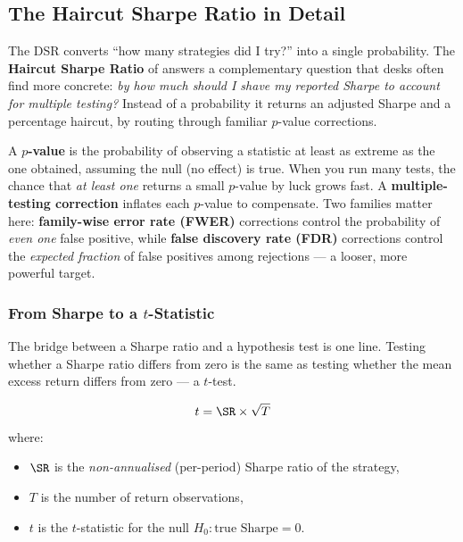 \subsection{The Haircut Sharpe Ratio in Detail}
\label{sec:eval-haircut-detail}

The DSR converts ``how many strategies did I try?'' into a single probability.
The \textbf{Haircut Sharpe Ratio} of \citet{HarveyLiu2015} answers a complementary question that desks often find more concrete: \emph{by how much should I shave my reported Sharpe to account for multiple testing?}
Instead of a probability it returns an adjusted Sharpe and a percentage haircut, by routing through familiar $p$-value corrections.

\begin{prereq}
A \textbf{$p$-value} is the probability of observing a statistic at least as extreme as the one obtained, assuming the null (no effect) is true.
When you run many tests, the chance that \emph{at least one} returns a small $p$-value by luck grows fast.
A \textbf{multiple-testing correction} inflates each $p$-value to compensate.
Two families matter here: \textbf{family-wise error rate (FWER)} corrections control the probability of \emph{even one} false positive, while \textbf{false discovery rate (FDR)} corrections control the \emph{expected fraction} of false positives among rejections --- a looser, more powerful target.
\end{prereq}

\subsubsection{From Sharpe to a $t$-Statistic}

The bridge between a Sharpe ratio and a hypothesis test is one line.
Testing whether a Sharpe ratio differs from zero is the same as testing whether the mean excess return differs from zero --- a $t$-test.

\begin{equation}
\label{eq:eval-sr-to-t}
t = \SR \times \sqrt{T}
\end{equation}
where:
\begin{itemize}[nosep]
  \item $\SR$ is the \emph{non-annualised} (per-period) Sharpe ratio of the strategy,
  \item $T$ is the number of return observations,
  \item $t$ is the $t$-statistic for the null $H_0: \text{true Sharpe} = 0$.
\end{itemize}

